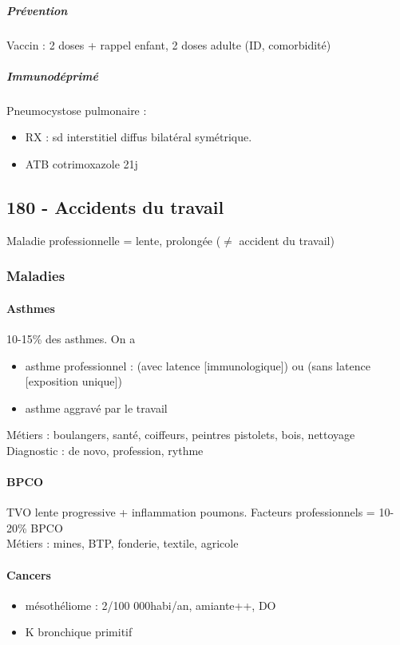 \documentclass[11pt]{article}
\begin{document}
\subparagraph{Prévention}
\label{sec:org135ea13}
Vaccin : 2 doses + rappel enfant, 2 doses adulte (ID, comorbidité)

\subparagraph{Immunodéprimé}
\label{sec:orgdc0a268}
Pneumocystose pulmonaire : 

\begin{itemize}
\item RX : sd interstitiel diffus bilatéral symétrique.
\item ATB cotrimoxazole 21j
\end{itemize}

\subsection{180 \textdagger{} - Accidents du travail}
\label{sec:org935883d}
Maladie professionnelle = lente, prolongée (\(\neq\) accident du travail)
\subsubsection{Maladies}
\label{sec:org0943699}
\paragraph{Asthmes}
\label{sec:orgf0c9158}
10-15\% des asthmes. On a

\begin{itemize}
\item asthme professionnel : (avec latence [immunologique]) ou (sans latence
[exposition unique])
\item asthme aggravé par le travail
\end{itemize}

Métiers : boulangers, santé, coiffeurs, peintres pistolets, bois, nettoyage\\
Diagnostic : de novo, profession, rythme
\paragraph{BPCO}
\label{sec:org09b2658}
\gls{TVO} lente progressive + inflammation
poumons. Facteurs professionnels = 10-20\% BPCO\\
Métiers : mines, BTP, fonderie, textile, agricole
\paragraph{Cancers}
\label{sec:org09be2a2}

\begin{itemize}
\item mésothéliome : 2/100 000habi/an, amiante++, DO
\item K bronchique primitif
\end{itemize}
\end{document}
